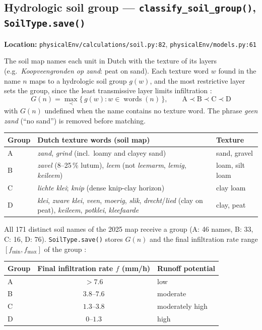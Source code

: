 \documentclass[11pt]{article}
\newcommand{\code}[1]{\texttt{#1}}
\begin{document}
\subsection{Hydrologic soil group --- \code{classify\_soil\_group()}, \code{SoilType.save()}}
\textbf{Location:} \code{physicalEnv/calculations/soil.py:82}, \code{physicalEnv/models.py:61}

The soil map names each unit in Dutch with the texture of its layers (e.g.\ \textit{Koopveengronden op zand}: peat on sand). Each texture word $w$ found in the name $n$ maps to a hydrologic soil group $g(w)$, and the most restrictive layer sets the group, since the least transmissive layer limits infiltration \cite{NEH630ch7}:
\begin{equation}
  G(n) = \max_{\prec} \{\, g(w) : w \in \operatorname{words}(n) \,\}, \qquad \mathrm{A} \prec \mathrm{B} \prec \mathrm{C} \prec \mathrm{D}
\end{equation}
with $G(n)$ undefined when the name contains no texture word. The phrase \textit{geen zand} (``no sand'') is removed before matching.

\begin{center}
\begin{tabular}{l p{6.2cm} p{4.4cm}}
\toprule
Group & Dutch texture words (soil map) & Texture \\
\midrule
A & \textit{zand}, \textit{grind} (incl.\ loamy and clayey sand) & sand, gravel \\
B & \textit{zavel} (8--25\,\% lutum), \textit{leem} (not \textit{leemarm}, \textit{lemig}, \textit{keileem}) & loam, silt loam \\
C & \textit{lichte klei}; \textit{knip} (dense knip-clay horizon) & clay loam \\
D & \textit{klei}, \textit{zware klei}, \textit{veen}, \textit{moerig}, \textit{slik}, \textit{drecht}/\textit{lied} (clay on peat), \textit{keileem}, \textit{potklei}, \textit{kleefaarde} & clay, peat \\
\bottomrule
\end{tabular}
\end{center}

All 171 distinct soil names of the 2025 map receive a group (A: 46 names, B: 33, C: 16, D: 76). \code{SoilType.save()} stores $G(n)$ and the final infiltration rate range $[f_{\min}, f_{\max}]$ of the group \cite{NEH630ch7}:

\begin{center}
\begin{tabular}{l c l}
\toprule
Group & Final infiltration rate $f$ (\si{mm/h}) & Runoff potential \\
\midrule
A & $> 7.6$ & low \\
B & $3.8$--$7.6$ & moderate \\
C & $1.3$--$3.8$ & moderately high \\
D & $0$--$1.3$ & high \\
\bottomrule
\end{tabular}
\end{center}
\end{document}
